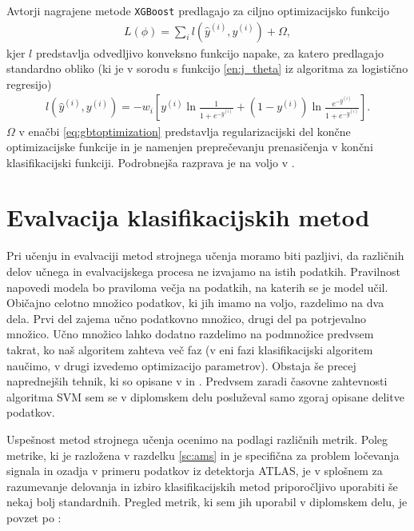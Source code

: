 \documentclass[11pt,a4paper,openany]{book}
\begin{document}
Avtorji nagrajene metode \texttt{XGBoost} \cite{chen2014, chenG16} predlagajo za ciljno optimizacijsko funkcijo 
\begin{eqnarray}
	L(\phi) = \sum_i l(\hat{y}^{(i)}, y^{(i)}) + \Omega,
	\label{eq:gbtoptimization}
\end{eqnarray}
kjer $l$ predstavlja odvedljivo konveksno funkcijo napake, za katero predlagajo standardno obliko (ki je v sorodu s funkcijo \ref{en:j_theta} iz algoritma za logistično regresijo)
\begin{eqnarray}
	l(\hat{y}^{(i)}, y^{(i)}) = -w_i\left[
		y^{(i)} \ln \frac{1}{1 + e^{-\hat{y}^{(i)}}} +
		(1 - y^{(i)}) \ln \frac{e^{-\hat{y}^{(i)}}}{1 + e^{-\hat{y}^{(i)}}}
	\right].
\end{eqnarray}
$\Omega$ v enačbi \ref{eq:gbtoptimization} predstavlja regularizacijski del končne optimizacijske funkcije in je namenjen preprečevanju prenasičenja v končni klasifikacijski funkciji. Podrobnejša razprava je na voljo v \cite{chen2014}.

\section{Evalvacija klasifikacijskih metod}
\label{sec:ml_eval}
Pri učenju in evalvaciji metod strojnega učenja moramo biti pazljivi, da različnih delov učnega in evalvacijskega procesa ne izvajamo na istih podatkih. Pravilnost napovedi modela bo praviloma večja na podatkih, na katerih se je model učil. Običajno celotno množico podatkov, ki jih imamo na voljo, razdelimo na dva dela. Prvi del zajema učno podatkovno množico, drugi del pa potrjevalno množico. Učno množico lahko dodatno razdelimo na podmnožice predvsem takrat, ko naš algoritem zahteva več faz (v eni fazi klasifikacijski algoritem naučimo, v drugi izvedemo optimizacijo parametrov). Obstaja še precej naprednejših tehnik, ki so opisane v \cite{Mitchell1997} in \cite{Witten2005}. Predvsem zaradi časovne zahtevnosti algoritma SVM sem se v diplomskem delu posluževal samo zgoraj opisane delitve podatkov.

Uspešnost metod strojnega učenja ocenimo na podlagi različnih metrik. Poleg metrike, ki je razložena v razdelku \ref{sc:ams} in je specifična za problem ločevanja signala in ozadja v primeru podatkov iz detektorja ATLAS, je v splošnem za razumevanje delovanja in izbiro klasifikacijskih metod priporočljivo uporabiti še nekaj bolj standardnih. Pregled metrik, ki sem jih uporabil v diplomskem delu, je povzet po \cite{wiki:precision_and_recall}:
\end{document}
